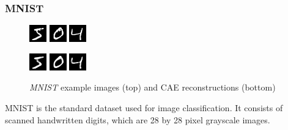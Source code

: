 \documentclass{article}
\begin{document}
    \subsubsection{MNIST}
        \begin{figure}[h]
          \centering
          \includegraphics[width=0.15\linewidth]{../graphics/reconstructions/mnist/input_00.png}
          \includegraphics[width=0.15\linewidth]{../graphics/reconstructions/mnist/input_01.png}
          \includegraphics[width=0.15\linewidth]{../graphics/reconstructions/mnist/input_02.png}

          \includegraphics[width=0.15\linewidth]{../graphics/reconstructions/mnist/reconstruction_00.png}
          \includegraphics[width=0.15\linewidth]{../graphics/reconstructions/mnist/reconstruction_01.png}
          \includegraphics[width=0.15\linewidth]{../graphics/reconstructions/mnist/reconstruction_02.png}

          \caption{\emph{MNIST} example images (top) and CAE reconstructions (bottom)}
        \end{figure}
        MNIST \citep{lecun1998mnist} is the standard dataset used for image classification. It consists of scanned handwritten digits, which are 28 by 28 pixel grayscale images.
\end{document}
